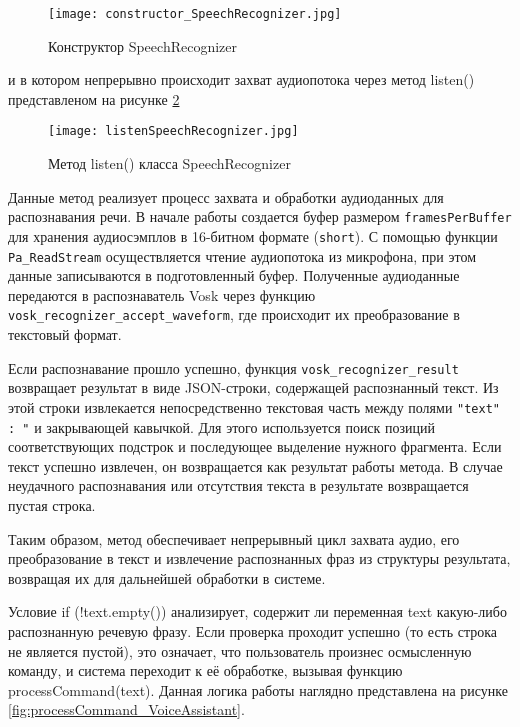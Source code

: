 \begin{figure}[H]
	\centering
	\texttt{[image: constructor\_SpeechRecognizer.jpg]}
	\caption{Конструктор SpeechRecognizer}
		\label{fig:constructor_SpeechRecognizer}
\end{figure}


и в котором непрерывно происходит захват аудиопотока через метод listen() представленом на рисунке \ref{fig:listenSpeechRecognizer}

\begin{figure}[H]
	\centering
	\texttt{[image: listenSpeechRecognizer.jpg]}
	\caption{Метод listen() класса SpeechRecognizer}
	\label{fig:listenSpeechRecognizer}
\end{figure}

Данные метод реализует процесс захвата и обработки аудиоданных для распознавания речи. В начале работы создается буфер размером \texttt{framesPerBuffer} для хранения аудиосэмплов в 16-битном формате (\texttt{short}). С помощью функции \texttt{Pa\_ReadStream} осуществляется чтение аудиопотока из микрофона, при этом данные записываются в подготовленный буфер. Полученные аудиоданные передаются в распознаватель Vosk через функцию \texttt{vosk\_recognizer\_accept\_waveform}, где происходит их преобразование в текстовый формат.

Если распознавание прошло успешно, функция \texttt{vosk\_recognizer\_result} возвращает результат в виде JSON-строки, содержащей распознанный текст. Из этой строки извлекается непосредственно текстовая часть между полями \texttt{\string"text\string" : \string"} и закрывающей кавычкой. Для этого используется поиск позиций соответствующих подстрок и последующее выделение нужного фрагмента. Если текст успешно извлечен, он возвращается как результат работы метода. В случае неудачного распознавания или отсутствия текста в результате возвращается пустая строка.

Таким образом, метод обеспечивает непрерывный цикл захвата аудио, его преобразование в текст и извлечение распознанных фраз из структуры результата, возвращая их для дальнейшей обработки в системе.

Условие if (!text.empty()) анализирует, содержит ли переменная text какую-либо распознанную речевую фразу. Если проверка проходит успешно (то есть строка не является пустой), это означает, что пользователь произнес осмысленную команду, и система переходит к её обработке, вызывая функцию processCommand(text). Данная логика работы наглядно представлена на рисунке \ref{fig:processCommand_VoiceAssistant}.

